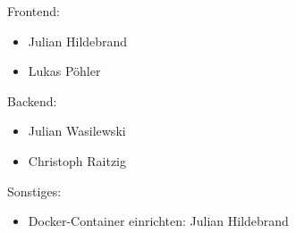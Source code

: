 Frontend:
\begin{itemize}
 \item Julian Hildebrand
 \item Lukas Pöhler
\end{itemize}
Backend:
\begin{itemize}
 \item Julian Wasilewski
 \item Christoph Raitzig
\end{itemize}
Sonstiges:
\begin{itemize}
 \item Docker-Container einrichten: Julian Hildebrand
\end{itemize}
